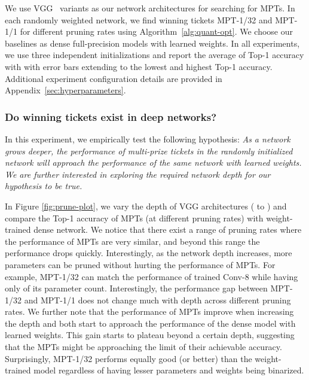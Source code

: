 \documentclass{article} \usepackage{iclr2021_conference,times}
\begin{document}
We use VGG~\citep{simonyan2014very} variants as our network architectures for searching for MPTs. In each randomly weighted network, we find winning tickets MPT-1/32 and MPT-1/1 for different pruning rates using Algorithm~\ref{alg:quant-opt}. We choose our baselines as dense full-precision models with learned weights. In all experiments, we use three independent initializations and report the average of Top-1 accuracy with with error bars extending to the lowest and highest Top-1 accuracy. Additional experiment configuration details are provided in Appendix~\ref{sec:hyperparameters}.


\subsubsection{Do winning tickets exist in deep networks?} \label{sec:exp-deep}

In this experiment, we empirically test the following hypothesis: \emph{As a network grows deeper, the performance of multi-prize tickets in the randomly initialized network will approach the performance of the same network with learned weights. We are further interested in exploring the required network depth for our hypothesis to be true.}

In Figure \ref{fig:prune-plot}, we vary the depth of VGG architectures ( to ) and compare the Top-1 accuracy of MPTs (at different pruning rates) with weight-trained dense network. We notice that there exist a range of pruning rates where the performance of MPTs are very similar, and beyond this range the performance drops quickly. Interestingly, as the network depth increases, more parameters can be pruned without hurting the performance of MPTs. For example, MPT-1/32 can match the performance of trained Conv-8 while having only  of its parameter count. Interestingly, the performance gap between MPT-1/32 and MPT-1/1 does not change much with depth across different pruning rates. 
We further note that the performance of MPTs improve when increasing the depth and both start to approach the performance of the dense model with learned weights. This gain starts to plateau beyond a certain depth, suggesting that the MPTs might be approaching the limit of their achievable accuracy. 
Surprisingly, MPT-1/32 performs equally good (or better) than the weight-trained model regardless of having  lesser parameters and weights being binarized. 
\end{document}
